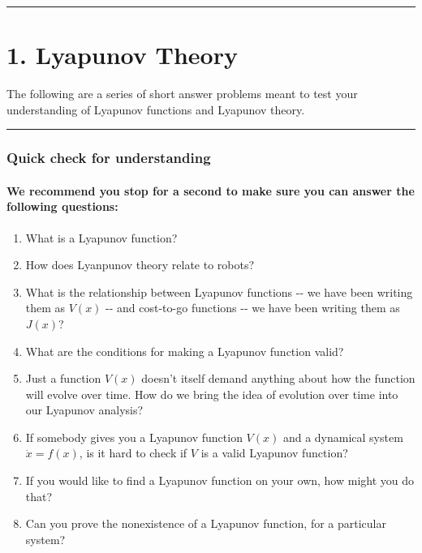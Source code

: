 \documentclass[11pt]{article}
\begin{document}
\begin{center}\rule{0.5\linewidth}{\linethickness}\end{center}

    \section{1. Lyapunov Theory}\label{lyapunov-theory}

The following are a series of short answer problems meant to test your
understanding of Lyapunov functions and Lyapunov theory.

    \begin{center}\rule{0.5\linewidth}{\linethickness}\end{center}

\subsubsection{Quick check for
understanding}\label{quick-check-for-understanding}

\paragraph{We recommend you stop for a second to make sure you can
answer the following
questions:}\label{we-recommend-you-stop-for-a-second-to-make-sure-you-can-answer-the-following-questions}

\begin{enumerate}
\def\labelenumi{\arabic{enumi}.}
\item
  What is a Lyapunov function?
\item
  How does Lyanpunov theory relate to robots?
\item
  What is the relationship between Lyapunov functions -\/- we have been
  writing them as \(V(x)\) -\/- and cost-to-go functions -\/- we have
  been writing them as \(J(x)\)?
\item
  What are the conditions for making a Lyapunov function valid?
\item
  Just a function \(V(x)\) doesn't itself demand anything about how the
  function will evolve over time. How do we bring the idea of evolution
  over time into our Lyapunov analysis?
\item
  If somebody gives you a Lyapunov function \(V(x)\) and a dynamical
  system \(\dot{x} = f(x)\), is it hard to check if \(V\) is a valid
  Lyapunov function?
\item
  If you would like to find a Lyapunov function on your own, how might
  you do that?
\item
  Can you prove the nonexistence of a Lyapunov function, for a
  particular system?
\end{enumerate}
\end{document}

